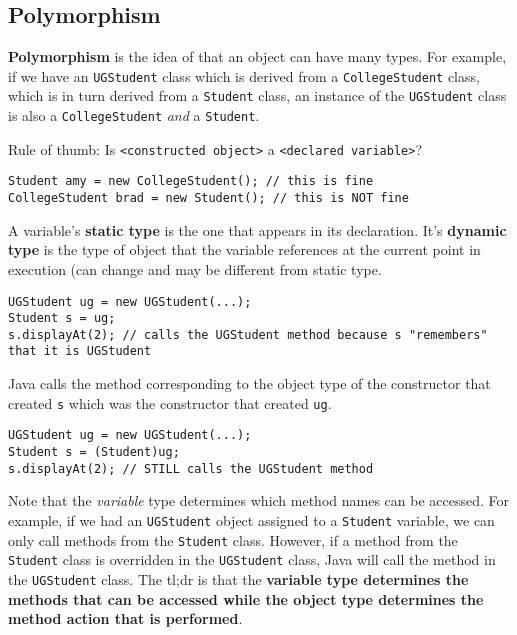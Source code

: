 \documentclass{article}
\newcommand{\nline}{\vspace{\baselineskip}}
\begin{document}
\begin{flushleft}
\subsection{Polymorphism}

\textbf{Polymorphism} is the idea of that an object can have many types. For example, if we have an \texttt{UGStudent} class which is derived from a \texttt{CollegeStudent} class, which is in turn derived from a \texttt{Student} class, an instance of the \texttt{UGStudent} class is also a \texttt{CollegeStudent} \textit{and} a \texttt{Student}.

\nline

Rule of thumb: Is \texttt{<constructed object>} a \texttt{<declared variable>}?

\begin{verbatim}
Student amy = new CollegeStudent(); // this is fine
CollegeStudent brad = new Student(); // this is NOT fine
\end{verbatim}

A variable's \textbf{static type} is the one that appears in its declaration. It's \textbf{dynamic type} is the type of object that the variable references at the current point in execution (can change and may be different from static type.

\begin{verbatim}
UGStudent ug = new UGStudent(...);
Student s = ug;
s.displayAt(2); // calls the UGStudent method because s "remembers" that it is UGStudent
\end{verbatim}

Java calls the method corresponding to the object type of the constructor that created \texttt{s} which was the constructor that created \texttt{ug}.

\begin{verbatim}
UGStudent ug = new UGStudent(...);
Student s = (Student)ug;
s.displayAt(2); // STILL calls the UGStudent method
\end{verbatim}

Note that the \textit{variable} type determines which method names can be accessed. For example, if we had an \texttt{UGStudent} object assigned to a \texttt{Student} variable, we can only call methods from the \texttt{Student} class. However, if a method from the \texttt{Student} class is overridden in the \texttt{UGStudent} class, Java will call the method in the \texttt{UGStudent} class. The tl;dr is that the \textbf{variable type determines the methods that can be accessed while the object type determines the method action that is performed}.


\end{flushleft}
\end{document}

